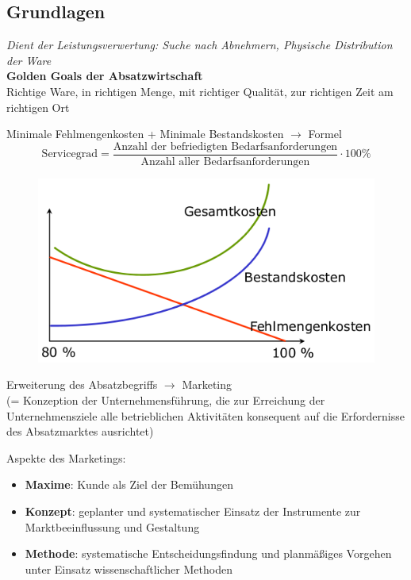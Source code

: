 \documentclass[a4paper,11pt, twoside]{article}
\begin{document}
\subsection{Grundlagen}
\textit{Dient der Leistungsverwertung: Suche nach Abnehmern, Physische Distribution der Ware}\\
\textbf{Golden Goals der Absatzwirtschaft}\\
Richtige Ware, in richtigen Menge, mit richtiger Qualität, zur richtigen Zeit am richtigen Ort

Minimale Fehlmengenkosten + Minimale Bestandskosten $\rightarrow$ Formel
\begin{equation}
\text{Servicegrad} = \frac{\text{Anzahl der befriedigten Bedarfsanforderungen}}{\text{Anzahl aller Bedarfsanforderungen}} \cdot 100\%
\end{equation}
\begin{figure}[h]
 \begin{center}
   \includegraphics[scale=0.3]{bilder/servicegrad.png}
 \end{center}
\end{figure}

Erweiterung des Absatzbegriffs $\rightarrow$ Marketing\\ 
(= Konzeption der Unternehmensführung, die zur Erreichung der Unternehmensziele alle betrieblichen Aktivitäten konsequent auf die Erfordernisse des Absatzmarktes ausrichtet)

Aspekte des Marketings:
\begin{itemize}
	\item \textbf{Maxime}: Kunde als Ziel der Bemühungen
	\item  \textbf{Konzept}: geplanter und systematischer Einsatz der Instrumente zur Marktbeeinflussung und Gestaltung
	\item \textbf{Methode}: systematische Entscheidungsfindung und planmäßiges Vorgehen unter Einsatz wissenschaftlicher Methoden
\end{itemize}
\end{document}
